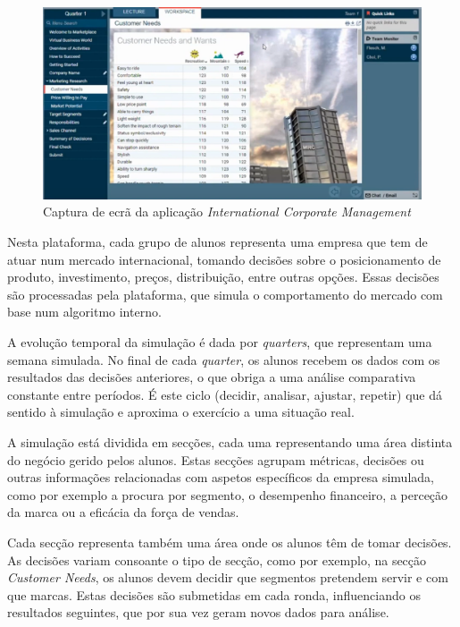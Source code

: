 \begin{figure}[h]
    \centering
    \includegraphics[max width=\textwidth]{./img/marketplace1}
 \caption{Captura de ecrã da aplicação \textit{International Corporate Management}}
 \label{fig:marketplace1}
 \end{figure}

Nesta plataforma, cada grupo de alunos representa uma empresa que tem de atuar num mercado internacional, tomando decisões sobre o posicionamento de produto, investimento, preços, distribuição, entre outras opções. Essas decisões são processadas pela plataforma, que simula o comportamento do mercado com base num algoritmo interno. 

A evolução temporal da simulação é dada por \textit{quarters}, que representam uma semana simulada. No final de cada \textit{quarter}, os alunos recebem os dados com os resultados das decisões anteriores, o que obriga a uma análise comparativa constante entre períodos. É este ciclo (decidir, analisar, ajustar, repetir) que dá sentido à simulação e aproxima o exercício a uma situação real.

A simulação está dividida em secções, cada uma representando uma área distinta do negócio gerido pelos alunos. Estas secções agrupam métricas, decisões ou outras informações relacionadas com aspetos específicos da empresa simulada, como por exemplo a procura por segmento, o desempenho financeiro, a perceção da marca ou a eficácia da força de vendas.

Cada secção representa também uma área onde os alunos têm de tomar decisões. As decisões variam consoante o tipo de secção, como por exemplo, na secção \textit{Customer Needs}, os alunos devem decidir que segmentos pretendem servir e com que marcas. Estas decisões são submetidas em cada ronda, influenciando os resultados seguintes, que por sua vez geram novos dados para análise.

